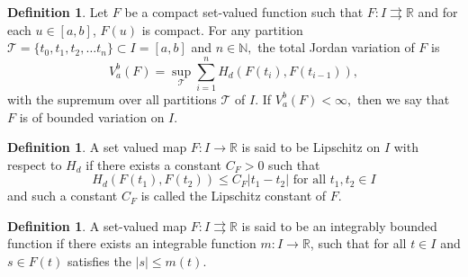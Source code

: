 \documentclass{amsproc}
\theoremstyle{definition}
\newtheorem{definition}[theorem]{Definition}
\theoremstyle{remark}
\numberwithin{equation}{section}
\begin{document}
\begin{definition}
    Let $F$ be a compact set-valued function such that $F:I\rightrightarrows \mathbb{R}$ and for each $u\in [a,b]$, $F(u)$ is compact. For any partition $\mathcal{T}=\{t_0,t_1,t_2,\ldots t_n\}\subset I= [a,b]$ and $n\in \mathbb{N},$ the total Jordan variation of $ F$ is
    \[ V_a^b(F)=\sup_{\mathcal{T}} \sum_{i=1}^nH_d(F(t_i),F(t_{i-1})), \]
    with the supremum over all partitions $\mathcal{T}$ of $I.$ If $V_a^b(F)< \infty,$ then we say that $F$ is of bounded variation on $I.$ 

 \begin{definition}
     A set valued map $F:I\to \mathbb{R}$ is said to be Lipschitz on $I$ with respect to $H_d$ if there exists a constant $C_F>0$ such that 
     \[ H_d(F(t_1),F(t_2)) \le C_F|t_1-t_2| \text{ for all } t_1,t_2 \in I \] 
     and such a constant $C_F$ is called the Lipschitz constant of $F.$ 
 \end{definition}   
    \begin{definition}
        A set-valued map $F:I \rightrightarrows\mathbb{R}$ is said to be an integrably bounded function if there exists an integrable function $m:I\to \mathbb{R}$, such that  for all $t\in I$ and $s\in F(t)$ satisfies the $|s|\le m(t).$
    \end{definition}
    
\end{definition}
\end{document}
